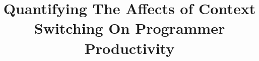 \documentclass{acm_proc_article-sp}
\begin{document}
\title{Quantifying The Affects of Context Switching On Programmer Productivity}

%
%
%
%
%
\end{document}
